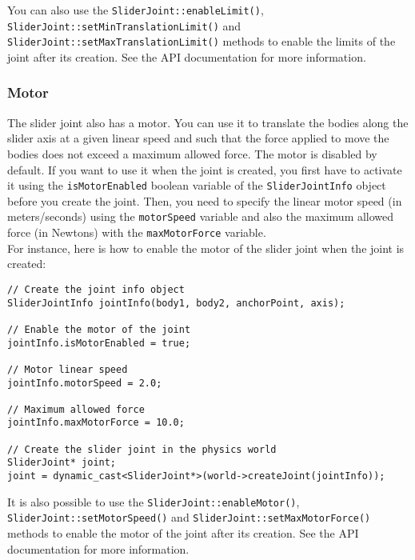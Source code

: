 \documentclass[a4paper,12pt]{article}
\begin{document}
    \vspace{0.6cm}

   \begin{sloppypar}
     You can also use the \texttt{SliderJoint::enableLimit()}, \texttt{SliderJoint::\-setMinTranslationLimit()} and \texttt{SliderJoint::setMaxTranslationLimit()} methods to
     enable the limits of the joint after its creation. See the API documentation for more information.
    \end{sloppypar}

    \subsubsection{Motor}

     The slider joint also has a motor. You can use it to translate the bodies along the slider axis at a given linear speed and such that the force applied to
     move the bodies does not exceed a maximum allowed force. The motor is disabled by default. If you want to use it when the joint is created, you first have to activate it using the
     \texttt{isMotorEnabled} boolean variable of the \texttt{SliderJointInfo} object before you create the joint. Then, you need to specify the linear motor speed (in meters/seconds)
     using the \texttt{motorSpeed} variable and also the maximum allowed force (in Newtons) with the \texttt{maxMotorForce} variable. \\

     For instance, here is how to enable the motor of the slider joint when the joint is created: \\

     \begin{lstlisting}
// Create the joint info object
SliderJointInfo jointInfo(body1, body2, anchorPoint, axis);

// Enable the motor of the joint
jointInfo.isMotorEnabled = true;

// Motor linear speed
jointInfo.motorSpeed = 2.0;

// Maximum allowed force
jointInfo.maxMotorForce = 10.0;

// Create the slider joint in the physics world
SliderJoint* joint;
joint = dynamic_cast<SliderJoint*>(world->createJoint(jointInfo));
  \end{lstlisting}

     \vspace{0.6cm}

     \begin{sloppypar}
        It is also possible to use the \texttt{SliderJoint::enableMotor()}, \texttt{SliderJoint::setMotorSpeed()} and \texttt{SliderJoint::setMaxMotorForce()} methods to enable the
        motor of the joint after its creation. See the API documentation for more information.
     \end{sloppypar}
\end{document}
